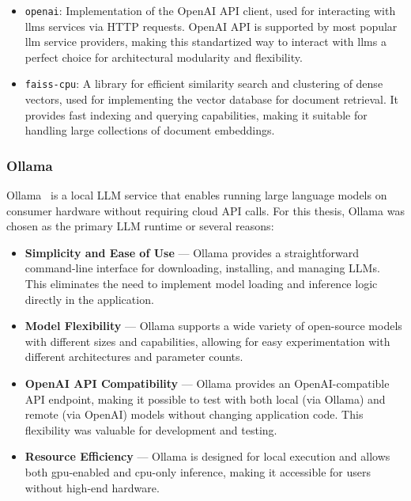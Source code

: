 \begin{itemize}
  \item \texttt{openai}: Implementation of the OpenAI API client,
    used for interacting with \glspl{llm} services via HTTP requests.
    OpenAI API is supported by most popular \gls{llm} service providers,
    making this standartized way to interact with \glspl{llm} a perfect choice
    for architectural modularity and flexibility.
  \item \texttt{faiss-cpu}: A library for efficient similarity search
    and clustering of dense vectors, used for implementing the vector
    database for document retrieval. It provides fast indexing and
    querying capabilities, making it suitable for handling large
    collections of document embeddings.
\end{itemize}

\subsubsection{Ollama}

Ollama~\cite{ollama-web} is a local LLM service that enables running large
language models on consumer hardware without requiring cloud API calls. For this
thesis, Ollama was chosen as the primary LLM runtime or several reasons: 

\begin{itemize}
  \item \textbf{Simplicity and Ease of Use} --- Ollama provides a
    straightforward command-line interface for downloading,
    installing, and managing LLMs. This eliminates the need to
    implement model loading and inference logic directly in the application.

  \item \textbf{Model Flexibility} --- Ollama supports a wide variety
    of open-source models with different sizes and capabilities,
    allowing for easy experimentation with different architectures
    and parameter counts.

  \item \textbf{OpenAI API Compatibility} --- Ollama provides an
    OpenAI-compatible API endpoint, making it possible to test with
    both local (via Ollama) and remote (via OpenAI) models without
    changing application code. This flexibility was valuable for
    development and testing.

  \item \textbf{Resource Efficiency} --- Ollama is designed for local
    execution and allows both \gls{gpu}-enabled and \gls{cpu}-only
    inference, making it accessible for users without high-end hardware.
\end{itemize}

